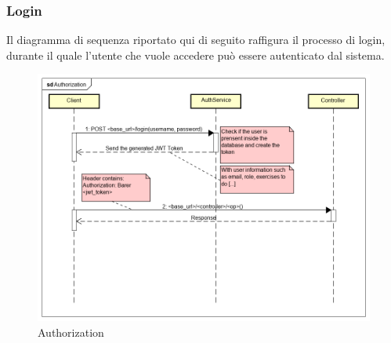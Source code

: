 \subsubsection{Login}
Il diagramma di sequenza riportato qui di seguito raffigura il processo di login, durante il quale l'utente che vuole accedere può essere autenticato dal sistema.
\begin{figure}[H]
\centering
\includegraphics[width=17cm, keepaspectratio]{img/Authorization.png} 
\caption{Authorization}
\end{figure}

